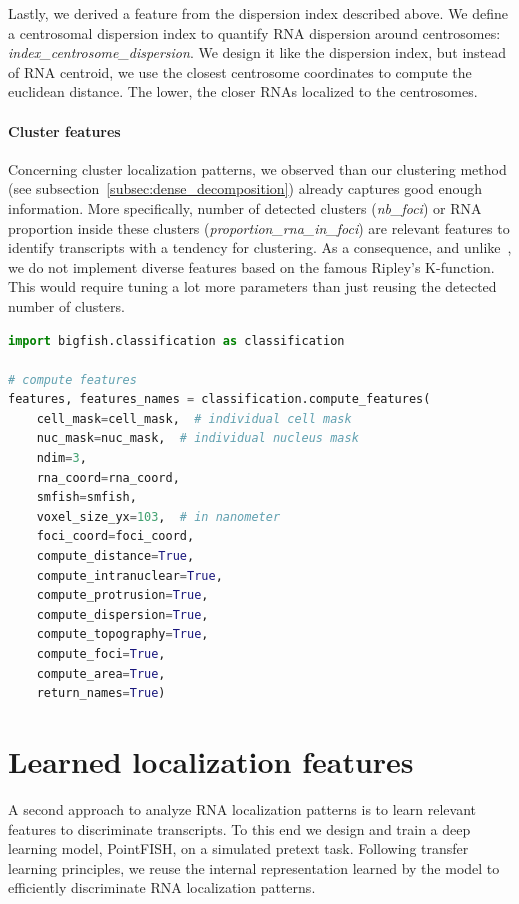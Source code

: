 Lastly, we derived a feature from the dispersion index described above.
We define a centrosomal dispersion index to quantify \ac{RNA} dispersion around centrosomes: \emph{index\_centrosome\_dispersion}.
We design it like the dispersion index, but instead of \ac{RNA} centroid, we use the closest centrosome coordinates to compute the euclidean distance.
The lower, the closer \ac{RNA}s localized to the centrosomes.

\paragraph{Cluster features}

Concerning cluster localization patterns, we observed than our clustering method (see subsection~\ref{subsec:dense_decomposition}) already captures good enough information.
More specifically, number of detected clusters (\emph{nb\_foci}) or \ac{RNA} proportion inside these clusters (\emph{proportion\_rna\_in\_foci}) are relevant features to identify transcripts with a tendency for clustering.
As a consequence, and unlike~\cite{samacoits_computational_2018}, we do not implement diverse features based on the famous Ripley's K-function.
This would require tuning a lot more parameters than just reusing the detected number of clusters.

\begin{minipage}{0.9\textwidth}
\begin{lstlisting}[language=Python]
import bigfish.classification as classification

# compute features
features, features_names = classification.compute_features(
    cell_mask=cell_mask,  # individual cell mask
	nuc_mask=nuc_mask,  # individual nucleus mask
	ndim=3,
	rna_coord=rna_coord,
    smfish=smfish,
	voxel_size_yx=103,  # in nanometer
    foci_coord=foci_coord,
    compute_distance=True,
    compute_intranuclear=True,
    compute_protrusion=True,
    compute_dispersion=True,
    compute_topography=True,
    compute_foci=True,
    compute_area=True,
    return_names=True)
\end{lstlisting}
\end{minipage}

\section{Learned localization features} \label{sec:learned_features}

A second approach to analyze \ac{RNA} localization patterns is to learn relevant features to discriminate transcripts.
To this end we design and train a deep learning model, PointFISH, on a simulated pretext task.
Following transfer learning principles, we reuse the internal representation learned by the model to efficiently discriminate \ac{RNA} localization patterns.

